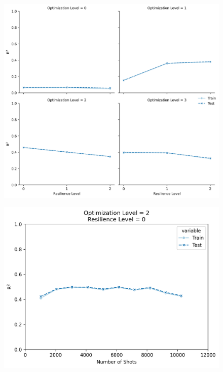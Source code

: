\documentclass[journal=jacsat,manuscript=article]{achemso}
\begin{document}
\begin{figure}[H]
	\centering
	\includegraphics[width=1\linewidth]{../images/DDCC/opt_res_fakequebec}
	\caption{}
	\label{fig:optresfakequebec}
\end{figure}

\begin{figure}[H]
	\centering
	\includegraphics[width=1\linewidth]{../images/DDCC/shots_fakequebec}
	\caption{}
	\label{fig:shotsfakequebec}
\end{figure}
\end{document}

